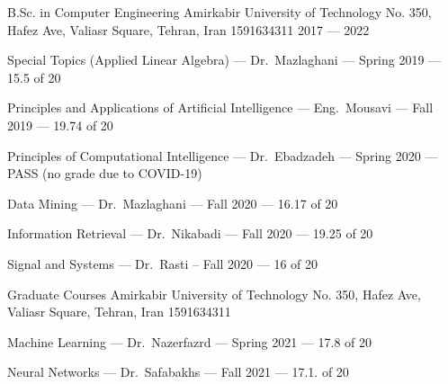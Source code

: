 

\begin{cventries}

  \cventry
    {B.Sc. in Computer Engineering} %
    {Amirkabir University of Technology} %
    {No. 350, Hafez Ave, Valiasr Square, Tehran, Iran 1591634311} %
    {2017 --- 2022} %
    {
        \begin{cvitems}
            \item Special Topics (Applied Linear Algebra) --- Dr.~Mazlaghani --- Spring 2019 --- 15.5 of 20
            \item Principles and Applications of Artificial Intelligence --- Eng.~Mousavi --- Fall 2019 --- 19.74 of 20
            \item Principles of Computational Intelligence --- Dr.~Ebadzadeh --- Spring 2020 --- PASS (no grade due to COVID-19)
            \item Data Mining --- Dr.~Mazlaghani --- Fall 2020 --- 16.17 of 20
            \item Information Retrieval --- Dr.~Nikabadi --- Fall 2020 --- 19.25 of 20
            \item Signal and Systems --- Dr.~Rasti -- Fall 2020 --- 16 of 20
        \end{cvitems}
    }

    \cventry
    {Graduate Courses} %
    {Amirkabir University of Technology} %
    {No. 350, Hafez Ave, Valiasr Square, Tehran, Iran 1591634311} %
    {} %
    {
        \begin{cvitems}
          \item Machine Learning --- Dr.~Nazerfazrd --- Spring 2021 --- 17.8 of 20
          \item Neural Networks --- Dr.~Safabakhs --- Fall 2021 --- 17.1. of 20
        \end{cvitems}
    }

\end{cventries}
